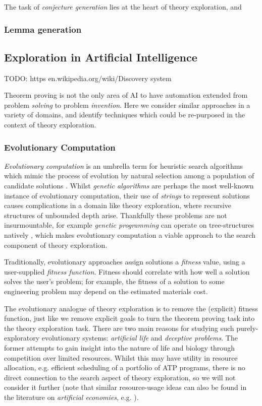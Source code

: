 \documentclass[]{article}
\begin{document}
The task of \emph{conjecture generation} lies at the heart of theory exploration, and

\subsubsection{Lemma generation}

\subsection{Exploration in Artificial Intelligence}

TODO: https en.wikipedia.org/wiki/Discovery system

Theorem proving is not the only area of AI to have automation extended from problem \emph{solving} to problem \emph{invention}. Here we consider similar approaches in a variety of domains, and identify techniques which could be re-purposed in the context of theory exploration.

\subsubsection{Evolutionary Computation}

\emph{Evolutionary computation} is an umbrella term for heuristic search algorithms which mimic the process of evolution by natural selection among a population of candidate solutions \cite{back1997evolutionary}. Whilst \emph{genetic algorithms} are perhaps the most well-known instance of evolutionary computation, their use of \emph{strings} to represent solutions causes complications in a domain like theory exploration, where recursive structures of unbounded depth arise. Thankfully these problems are not insurmountable, for example \emph{genetic programming} can operate on tree-structures natively \cite{banzhaf1998genetic}, which makes evolutionary computation a viable approach to the search component of theory exploration.

Traditionally, evolutionary approaches assign solutions a \emph{fitness} value, using a user-supplied \emph{fitness function}. Fitness should correlate with how well a solution solves the user's problem; for example, the fitness of a solution to some engineering problem may depend on the estimated materials cost.

The evolutionary analogue of theory exploration is to remove the (explicit) fitness function, just like we remove explicit goals to turn the theorem proving task into the theory exploration task. There are two main reasons for studying such purely-exploratory evolutionary systems: \emph{artificial life} and \emph{deceptive problems}. The former attempts to gain insight into the nature of life and biology through competition over limited resources. Whilst this may have utility in resource allocation, e.g. efficient scheduling of a portfolio of ATP programs, there is no direct connection to the search aspect of theory exploration, so we will not consider it further (note that similar resource-usage ideas can also be found in the literature on \emph{artificial economies}, e.g. \cite{baum2000evolution}).
\end{document}
